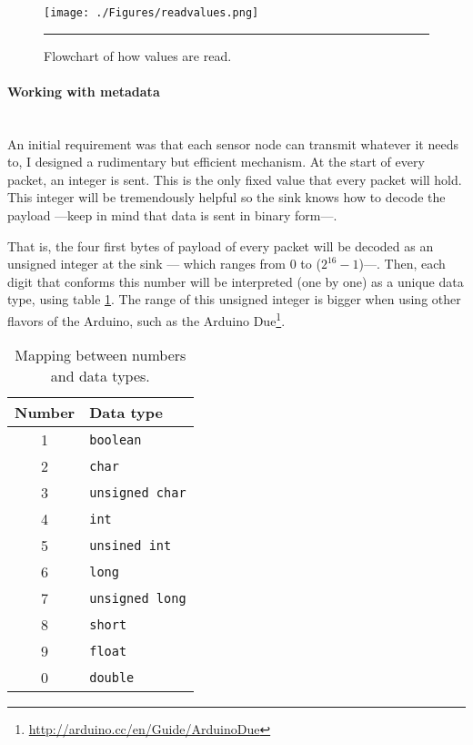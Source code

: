 \begin{figure}[htbp]
    \centering
        \texttt{[image: ./Figures/readvalues.png]}
        \rule{35em}{0.5pt}
    \caption[Value reading flowchart]{Flowchart of how values are read.}
    \label{fig:readvalues}
\end{figure}

\paragraph{Working with metadata}
~\\
An initial requirement was that each sensor node can transmit whatever it needs to, I designed a rudimentary but efficient mechanism. At the start of every packet, an integer is sent. This is the only fixed value that every packet will hold. This integer will be tremendously helpful so the sink knows how to decode the payload ---keep in mind that data is sent in binary form---.

That is, the four first bytes of payload of every packet will be decoded as an unsigned integer at the sink --- which ranges from $0$ to ($2^{16}-1$)---. Then, each digit that conforms this number will be interpreted (one by one) as a unique data type, using table \ref{tab:mapnumbers}. The range of this unsigned integer is bigger when using other flavors of the Arduino, such as the Arduino Due\footnote{\url{http://arduino.cc/en/Guide/ArduinoDue}}.

\begin{table}[ht] 
\centering
\begin{tabular}{c|l}
Number          & Data type             \\
\hline
1               & \texttt{boolean}      \\
2               & \texttt{char}         \\
3               & \texttt{unsigned char}\\
4               & \texttt{int}          \\
5               & \texttt{unsined int}  \\
6               & \texttt{long}         \\
7               & \texttt{unsigned long}\\
8               & \texttt{short}        \\
9               & \texttt{float}        \\
0               & \texttt{double}       \\
\end{tabular}
\caption{Mapping between numbers and data types.}
\label{tab:mapnumbers}
\end{table}

